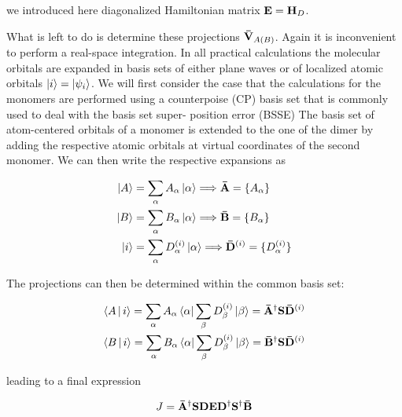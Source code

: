 we introduced here diagonalized Hamiltonian matrix 
$\mathbf{ E } = \mathbf{ H }_D$. 

What is left to do is determine these projections $\mathbf{ \bar{V} }_{A(B)}$. 
Again it
is inconvenient to perform a real-space integration. In all
practical calculations the molecular orbitals are expanded in
basis sets of either plane waves or of localized atomic orbitals
$\Ket{i} = \Ket{\psi_i}$. We will first consider the case that 
the calculations for
the monomers are performed using a counterpoise (CP) basis
set that is commonly used to deal with the basis set super-
position error (BSSE) The basis set of atom-centered
orbitals of a monomer is extended to the one of the dimer
by adding the respective atomic orbitals at virtual coordinates
of the second monomer. We can then write the respective
expansions as

\begin{equation}
 \begin{aligned}
  \Ket{A} &= \sum_{\alpha} A_{\alpha} \Ket{\alpha} 
  \Longrightarrow 
  \mathbf{ \bar{A} } = \{ A_{\alpha} \}
  \\
  \Ket{B} &= \sum_{\alpha} B_{\alpha} \Ket{\alpha}
  \Longrightarrow 
  \mathbf{ \bar{B} } = \{ B_{\alpha} \}
  \\
  \Ket{i} &= \sum_{\alpha} D^{(i)}_{\alpha} \Ket{\alpha}
  \Longrightarrow 
  \mathbf{ \bar{D} }^{(i)} = \{ D^{(i)}_{\alpha} \}
 \end{aligned}
  \label{eq:dipro_eq18}
\end{equation}

The projections can then be determined within the common
basis set:

\begin{equation}
 \begin{aligned}
    \Braket{A|i} = \sum_{\alpha} A_{\alpha} \Bra{\alpha}
    \sum_{\beta} D^{(i)}_{\beta} \Ket{\beta} = 
    \mathbf{ \bar{A} }^\dagger \mathbf{ S } \mathbf{ \bar{D} }^{(i)} \\
    \Braket{B|i} = \sum_{\alpha} B_{\alpha} \Bra{\alpha}
    \sum_{\beta} D^{(i)}_{\beta} \Ket{\beta} = 
    \mathbf{ \bar{B} }^\dagger \mathbf{ S } \mathbf{ \bar{D} }^{(i)} \\
 \end{aligned}
  \label{eq:dipro_eq19}
\end{equation}

leading to a final expression

\begin{equation}
 \begin{aligned}
    J = 
    \mathbf{ \bar{A} }^\dagger \mathbf{ S } \mathbf{ D } \mathbf{ E }
    \mathbf{ D }^\dagger \mathbf{ S }^\dagger \mathbf{ \bar{B} }  \\
 \end{aligned}
  \label{eq:dipro_eq20}
\end{equation}


